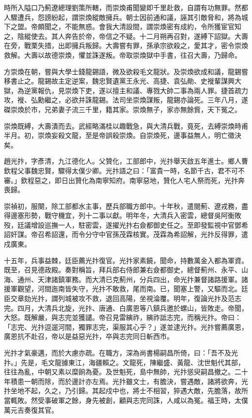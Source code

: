 \begin{pinyinscope}
時所入隘口乃薊遼總理劉策所轄，而崇煥甫聞變即千里赴救，自謂有功無罪。然都人驟遭兵，怨謗紛起，謂崇煥縱敵擁兵。朝士因前通和議，誣其引敵脅和，將為城下之盟。帝頗聞之，不能無惑。會我大清設間，謂崇煥密有成約，令所獲宦官知之，陰縱使去。其人奔告於帝，帝信之不疑。十二月朔再召對，遂縛下詔獄。大壽在旁，戰栗失措，出即擁兵叛歸。大壽嘗有罪，孫承宗欲殺之，愛其才，密令崇煥救解。大壽以故德崇煥，懼並誅遂叛。帝取崇煥獄中手書，往召大壽，乃歸命。

方崇煥在朝，嘗與大學士錢龍錫語，微及欲殺毛文龍狀。及崇煥欲成和議，龍錫嘗移書止之。龍錫故主定逆案，魏忠賢遺黨王永光、高捷、袁弘勛、史褷輩謀興大獄，為逆黨報仇，見崇煥下吏，遂以擅主和議、專戮大帥二事為兩人罪。捷首疏力攻，褷、弘勳繼之，必欲并誅龍錫。法司坐崇煥謀叛，龍錫亦論死。三年八月，遂磔崇煥於市，兄弟妻子流三千里，籍其家。崇煥無子，家亦無餘貲，天下冤之。

崇煥既縛，大壽潰而去。武經略滿桂以趣戰急，與大清兵戰，竟死，去縛崇煥時甫半月。初，崇煥妄殺文龍，至是帝誤殺崇煥。自崇煥死，邊事益無人，明亡徵決矣。

趙光抃，字彥清，九江德化人。父贊化，工部郎中，光抃舉天啟五年進士。鄉人曹欽程父事魏忠賢，驟得太僕少卿。光抃語之曰：「富貴一時，名節千古，君不可不審。」欽程惡之，即日出贊化為南寧知府。南寧惡地，贊化人宅人祭而死，光抃奔喪歸。

崇禎初，服闋，除工部都水主事，歷兵部職方郎中。十年秋，遣閱薊、遼戎務，盡得邊塞形勢，戰守機宜，列十二事以獻。明年冬，大清兵入密雲，總督吳阿衡敗歿，廷議增設巡撫一人，駐密雲，遂擢光抃右僉都御史任之。至即發監視中官鄧希詔奸謀。帝召希詔還，而令分守中官孫茂霖核實。茂霖為希詔解，光抃反得罪，遣戍廣東。

十五年，兵事益棘，廷臣薦光抃復官。光抃家素饒，聞命，持數萬金入都為軍資。既至，召見德政殿。奏對稱旨，拜兵部右侍郎兼右僉都御史，總督薊州、永平、山海、通州、天津諸鎮軍務。而大清已克薊州，分兵四出，命光抃兼督諸路援軍。諸援軍觀望，河間迤南皆失守，光抃不敢救，尾而南。已，聞塞上警，又驅而北。廷臣交章劾光抃，謂列城被攻不救，退回高陽，坐視淪覆。明年，復論光抃及范志完。四月，大清兵北旋，光抃、唐通、白廣恩等八鎮兵邀於螺山，皆敗走。帝聞，大怒。既解嚴，與志完並獲譴。帝召見雷縯祚，縯祚詆志完，而稱光抃。帝曰：「志完、光抃逗遛河間，獨罪志完，渠服其心乎？」遂並逮光抃。光抃嘗薦廣恩，廣恩抗不赴召，帝以是益惡光抃，卒與志完同日斬西市。

光抃才氣豪邁，而於大慮亦疏。在職方，深為尚書楊嗣昌所倚，曰：「吾不及光抃。」先是，毛文龍據東江，海疆賴之。文龍死，陳繼盛、黃龍、沈世魁代其部，往往為亂，中朝又素以糜餉為憂。及世魁死，島中無帥，光抃慫臾嗣昌撤之。二十年積患一朝而除，而於邊計亦左焉。光抃雖文士，有膽決，嘗遇敵，諸將欲奔，光抃坐地不起，久之，乃引歸。其起戍中也，將士不相習，猝遇大敵，先膽落，故所當輒敗。然受事破軍之餘，身先被創，顧與志完同誅，人咸以為冤。福王時，太僕萬元吉奏復其官。


\end{pinyinscope}
